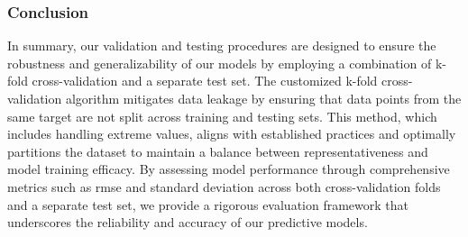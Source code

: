 \subsubsection{Conclusion}
In summary, our validation and testing procedures are designed to ensure the robustness and generalizability of our models by employing a combination of k-fold cross-validation and a separate test set.
The customized k-fold cross-validation algorithm mitigates data leakage by ensuring that data points from the same target are not split across training and testing sets.
This method, which includes handling extreme values, aligns with established practices and optimally partitions the dataset to maintain a balance between representativeness and model training efficacy.
By assessing model performance through comprehensive metrics such as \gls{rmse} and standard deviation across both cross-validation folds and a separate test set, we provide a rigorous evaluation framework that underscores the reliability and accuracy of our predictive models.

